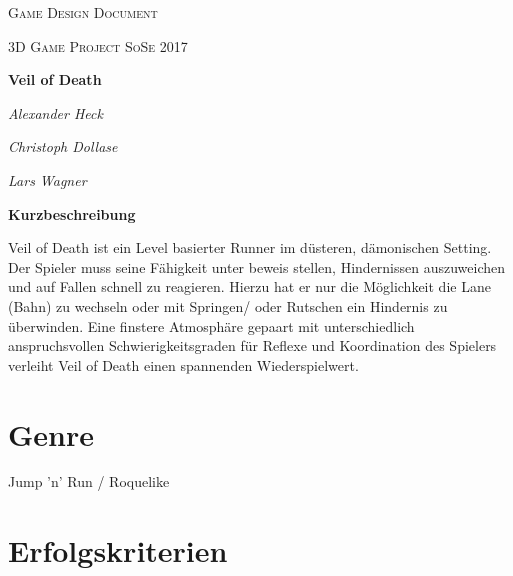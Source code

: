 \documentclass{article}
\begin{document}
\begin{titlepage}
	\centering
	{\scshape\LARGE Game Design Document \par}
	\vspace{1cm}
	{\scshape\Large 3D Game Project SoSe 2017\par}
	\vspace{1.5cm}
	{\Huge\bfseries Veil of Death\par}
	\vspace{2cm}
	{\Large\itshape Alexander Heck\par}
	\vspace{0.5cm}
	{\Large\itshape Christoph Dollase\par}
	\vspace{0.5cm}
	{\Large\itshape Lars Wagner\par}
\vspace{3cm}
\hline
\vspace{1cm}
\raggedright
{\large\bfseries Kurzbeschreibung \par}
\vspace{0.5cm}
Veil of Death ist ein Level basierter Runner im düsteren, dämonischen Setting. Der Spieler muss seine
Fähigkeit unter beweis stellen, Hindernissen auszuweichen und auf Fallen schnell zu
reagieren. Hierzu hat er nur die Möglichkeit die Lane (Bahn) zu wechseln oder mit
Springen/ oder Rutschen ein Hindernis zu überwinden. Eine finstere Atmosphäre gepaart mit
unterschiedlich anspruchsvollen Schwierigkeitsgraden für Reflexe und Koordination des Spielers
verleiht Veil of Death einen spannenden Wiederspielwert.

\vspace{1cm}
\hline
\vfill

\end{titlepage}
%

	

\newpage
\section{Genre}

Jump 'n' Run / Roquelike

\vspace{1cm}
\section{Erfolgskriterien}
\end{document}
